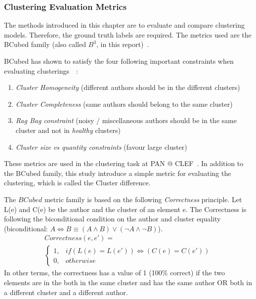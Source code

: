 \subsubsection{Clustering Evaluation Metrics \label{sec:clustering_evaluation_meterics}}

The methods introduced in this chapter are to evaluate and compare clustering models.
Therefore, the ground truth labels are required.
The metrics used are the BCubed family (also called $B^3$, in this report)~\cite{bcubed}.

BCubed has shown to satisfy the four following important constraints when evaluating clusterings~\cite{bcubed}~:

\begin{enumerate}
  \item
  \textit{Cluster Homogeneity} (different authors should be in the different clusters)
  \item
  \textit{Cluster Completeness} (same authors should belong to the same cluster)
  \item
  \textit{Rag Bag constraint} (noisy / miscellaneous authors should be in the same cluster and not in \textit{healthy} clusters)
  \item
  \textit{Cluster size vs quantity constraints} (favour large cluster)
\end{enumerate}

These metrics are used in the clustering task at PAN @ CLEF~\cite{pan16}.
In addition to the BCubed family, this study introduce a simple metric for evaluating the clustering, which is called the Cluster difference.

\begin{definition}
  The $BCubed$ metric family is based on the following \textit{Correctness} principle.
  Let L(e) and C(e) be the author and the cluster of an element e.
  The Correctness is following the biconditional condition on the author and cluster equality (biconditional: $A \Longleftrightarrow B \equiv (A \land B) \lor (\neg A \land \neg B)$).
  \begin{gather*}
    Correctness(e, e') = \\
    \begin{cases}
      1, & if (L(e) = L(e')) \Longleftrightarrow (C(e) = C(e'))\\
      0, & otherwise
    \end{cases}
  \end{gather*}
  In other terms, the correctness has a value of 1 (100\% correct) if the two elements are in the both in the same cluster and has the same author OR both in a different cluster and a different author.
\end{definition}


